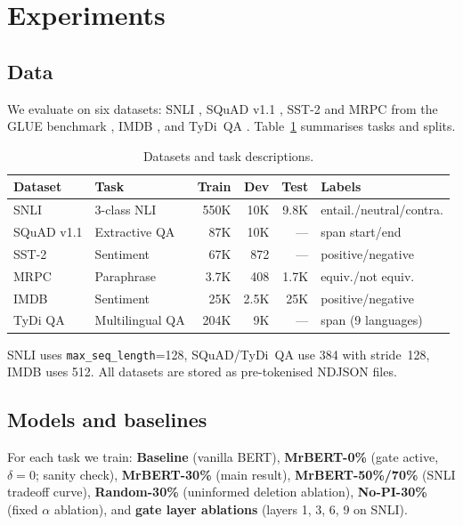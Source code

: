 \documentclass{article} %
\begin{document}
\section{Experiments}
\label{sec:experiments}

\subsection{Data}

We evaluate on six datasets: SNLI \citep{bowman2015snli}, SQuAD v1.1 \citep{rajpurkar2016squad}, SST-2 \citep{socher2013sst} and MRPC \citep{dolan2005mrpc} from the GLUE benchmark \citep{wang2019glue}, IMDB \citep{maas2011imdb}, and TyDi~QA \citep{clark2020tydiqa}. Table~\ref{tab:datasets} summarises tasks and splits.

\begin{table}[t]
\centering\small
\begin{tabular}{@{}llrrrl@{}}
\toprule
\textbf{Dataset} & \textbf{Task} & \textbf{Train} & \textbf{Dev} & \textbf{Test} & \textbf{Labels} \\
\midrule
SNLI       & 3-class NLI          & 550K  & 10K  & 9.8K & entail./neutral/contra. \\
SQuAD v1.1 & Extractive QA        & 87K   & 10K  & ---  & span start/end \\
SST-2      & Sentiment            & 67K   & 872  & ---  & positive/negative \\
MRPC       & Paraphrase           & 3.7K  & 408  & 1.7K & equiv./not equiv. \\
IMDB       & Sentiment            & 25K   & 2.5K & 25K  & positive/negative \\
TyDi QA   & Multilingual QA      & 204K  & 9K   & ---  & span (9 languages) \\
\bottomrule
\end{tabular}
\caption{Datasets and task descriptions.}
\label{tab:datasets}
\end{table}

SNLI uses \texttt{max\_seq\_length}=128, SQuAD/TyDi~QA use 384 with stride~128, IMDB uses 512. All datasets are stored as pre-tokenised NDJSON files.


\subsection{Models and baselines}

For each task we train: \textbf{Baseline} (vanilla BERT), \textbf{MrBERT-0\%} (gate active, $\delta=0$; sanity check), \textbf{MrBERT-30\%} (main result), \textbf{MrBERT-50\%/70\%} (SNLI tradeoff curve), \textbf{Random-30\%} (uninformed deletion ablation), \textbf{No-PI-30\%} (fixed $\alpha$ ablation), and \textbf{gate layer ablations} (layers 1, 3, 6, 9 on SNLI).
\end{document}
